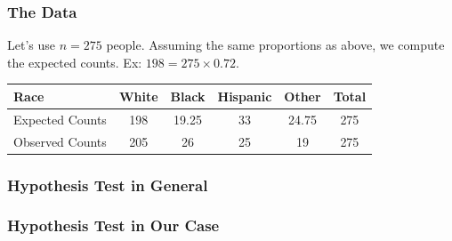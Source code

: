 \documentclass[handout]{beamer}
\newcommand{\blue}[1]{\textcolor{blue2}{#1}}
\begin{document}
\begin{frame}[fragile]
\frametitle{The Data}

Let's use $n=275$ people.  Assuming the same proportions as above,  we compute the \blue{expected} counts.  Ex: $198 = 275 \times 0.72$. 

\begin{center}
\begin{tabular}{l||cccc|c}
Race & White & Black & Hispanic & Other & Total \\ 
\hline
Expected Counts & 198 & 19.25 & 33 & 24.75 & 275\\ 
Observed Counts & 205 & 26 & 25 & 19 & 275\\ 
\end{tabular}
\end{center}

\end{frame}


\begin{frame}[fragile]
\frametitle{Hypothesis Test in General}
%
%
%

\end{frame}


\begin{frame}[fragile]
\frametitle{Hypothesis Test in Our Case}
%
%

\end{frame}
\end{document}
